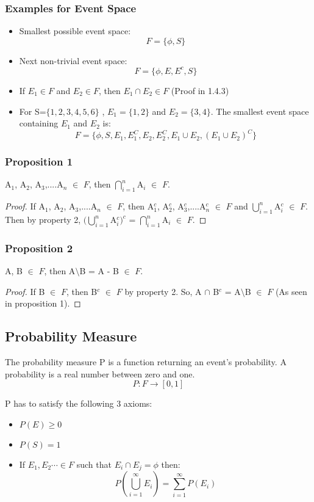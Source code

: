 \documentclass{article}
\begin{document}
\subsubsection{Examples for Event Space}
\begin{itemize}
    \item Smallest possible event space:
    $$ F =\{ \phi,S\} $$
    \item Next non-trivial event space:
    $$ F=\{ \phi,E ,E^c ,S\}$$
    \item If $E_1 \in F$ and $E_2 \in F$, then $E_1 \cap E_2 \in F$ (Proof in 1.4.3)
    \item For S=$\{1,2,3,4,5,6\}$ , $E_1 =\{1,2\}$ and $E_2=\{3,4\}$. The smallest event space containing $E_1$ and $E_2$ is:
    $$ F=\{\phi , S, E_1 , E_{1}^{C},E_2 , E_{2}^{C},E_1 \cup E_2 , (E_{1} \cup E_{2})^{C}\}$$
\end{itemize}

\subsubsection{Proposition 1}
A$_1$, A$_2$, A$_3$,....A$_n$ $\in$ $F$, then $\bigcap\limits_{i=1}^n$A$_i$ $\in$ $F$.

\begin{proof}
    If A$_1$, A$_2$, A$_3$,....A$_n$ $\in$ $F$, then A$_1^c$, A$_2^c$, A$_3^c$,....A$_n^c$ $\in$ $F$ and $\bigcup\limits_{i=1}^n$A$_i^c$ $\in$ $F$. Then by property 2, $(\bigcup\limits_{i=1}^n$A$_i^c)^c$ = $\bigcap\limits_{i=1}^n$A$_i$ $\in$ $F$.
\end{proof}

\subsubsection{Proposition 2}
A, B $\in$ $F$, then A$\setminus$B = A - B $\in$ $F$.\medskip

\begin{proof}
    If B $\in$ $F$, then B$^c$ $\in$ $F$ by  property 2. So, A $\cap$ B$^c$ = A$\setminus$B $\in$ $F$ (As seen in proposition 1).
\end{proof}
\subsection{Probability Measure}
The probability measure P is a function returning an event's probability. A probability is a real number between zero and one.
$$ P:F\rightarrow [0,1]$$

P has to satisfy the following 3 axioms:
\begin{itemize}
    \item $P(E) \geq 0$
    \item $P(S)=1$
    \item If $E_1,E_2 \cdots \in F$ such that $E_i \cap E_j =\phi$ then:
    $$ P(\bigcup_{i=1}^{\infty} E_{i})= \sum_{i=1}^{\infty} P(E_i)$$
\end{itemize}
\end{document}
